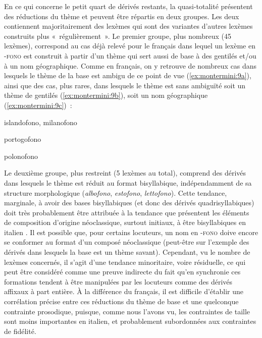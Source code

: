 \documentclass[output=paper]{langsci/langscibook}
\begin{document}
En ce qui concerne le petit quart de dérivés restants, la quasi-totalité
présentent des réductions du thème et peuvent être répartis en deux
groupes. Les deux contiennent majoritairement des lexèmes qui sont des
variantes d'autres lexèmes construits plus «~régulièrement~». Le premier
groupe, plus nombreux (45 lexèmes), correspond au cas déjà relevé pour
le français dans lequel un lexème en -\textsc{fono} est construit à
partir d'un thème qui sert aussi de base à des gentilés et/ou à un nom
géographique. Comme en français, on y retrouve de nombreux cas dans
lesquels le thème de la base est ambigu de ce point de vue (\ref{ex:montermini:9a}), ainsi
que des cas, plus rares, dans lesquels le thème est sans ambiguïté soit
un thème de gentilés (\ref{ex:montermini:9b}), soit un nom géographique (\ref{ex:montermini:9c})~:

\ea\label{ex:montermini:9}

\ea\label{ex:montermini:9a}  {islandofono}, {milanofono}

\ex\label{ex:montermini:9b}   {portogofono}

\ex\label{ex:montermini:9c}   {polonofono}
\z\z

Le deuxième groupe, plus restreint (5 lexèmes au total), comprend des
dérivés dans lesquels le thème est réduit au format bisyllabique,
indépendamment de sa structure morphologique (\emph{albofono},
\emph{estofono}, \emph{lettofono}). Cette tendance, marginale, à avoir
des bases bisyllabiques (et donc des dérivés quadrisyllabiques) doit
très probablement être attribuée à la tendance que présentent les
éléments de composition d'origine néoclassique, surtout initiaux, à être
bisyllabiques en italien %
\citep[cf.][253--259]{Thornton2007}%
%
. Il est possible
que, pour certains locuteurs, un nom en -\textsc{fono} doive encore se
conformer au format d'un composé néoclassique (peut-être sur l'exemple
des dérivés dans lesquels la base est un thème savant). Cependant, vu le
nombre de lexèmes concernés, il s'agit d'une tendance minoritaire, voire
résiduelle, ce qui peut être considéré comme une preuve indirecte du
fait qu'en synchronie ces formations tendent à être manipulées par les
locuteurs comme des dérivés affixaux à part entière. À la différence du
français, il est difficile d'établir une corrélation précise entre ces
réductions du thème de base et une quelconque contrainte prosodique,
puisque, comme nous l'avons vu, les contraintes de taille sont moins
importantes en italien, et probablement subordonnées aux contraintes de
fidélité.
\end{document}
